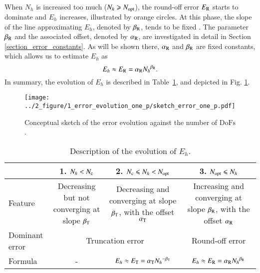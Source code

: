 \documentclass[review,3p]{elsarticle}
\begin{document}
When $N_h$ is increased too much ($N_h \geqslant N_{\rm opt}$), the round-off error $E_{\rm R}$ starts to dominate and $E_h$ increases, illustrated by orange circles. At this phase, the slope of the line approximating $E_h$, denoted by $\beta_{\rm R}$, tends to be fixed \cite{Babuska2018Roundoff,WalterFrei}. The parameter $\beta_{\rm R}$ and the associated offset, denoted by $\alpha_{\rm R}$, are investigated in detail in Section \ref{section_error_constants}. As will be shown there, $\alpha_{\rm R}$ and $\beta_{\rm R}$ are fixed constants, which allows us to estimate $E_h$ as
\begin{equation}
 E_{h} \approx E_{\rm R} = \alpha_{\rm R}{N_{h}}^{\beta_{\rm R}}.		\label{formula_round_off_error}
\end{equation}
In summary, the evolution of $E_h$ is described in Table~\ref{phases_error}, and depicted in Fig. \ref{error_evolution_one_p}.

\begin{figure}[!ht]
\centering
   \texttt{[image: ../2\_figure/1\_error\_evolution\_one\_p/sketch\_error\_one\_p.pdf]}
   \caption{Conceptual sketch of the error evolution against the number of $\text{DoFs}$.}
   \label{error_evolution_one_p}
\end{figure}
 
\begin{table}[!ht]
\small
\caption [sss] {Description of the evolution of $E_h$.}
\label{phases_error}
\centering
 \begin{tabular}{|l|c|c|c|} \hline   
 & 1. {$N_h < N_{\rm c}$} & 2. {$N_{\rm c} \leqslant N_h < N_{\rm opt}$} & 3. {$N_{\rm opt} \leqslant N_h$} \\ \hline
Feature & \makecell[l]{Decreasing but not\\ converging at slope $\beta_{\rm T}$} & \makecell[l]{Decreasing and converging\\ at slope $\beta_{\rm T}$, with the offset $\alpha_{\rm T}$} & \makecell[l]{Increasing and converging\\ at slope $\beta_{\rm R}$, with the offset $\alpha_{\rm R}$} \\	\hline
Dominant error & \multicolumn{2}{c|}{Truncation error} & Round-off error \\	\hline
Formula & - & $E_h \approx E_{\rm T}=\alpha_{\rm T}{N_h}^{-\beta_{\rm T}}$ & $E_h \approx E_{\rm R}=\alpha_{\rm R} {N_h}^{\beta _{\rm R}}$ \\	\hline
\end{tabular}
\end{table}
\end{document}
